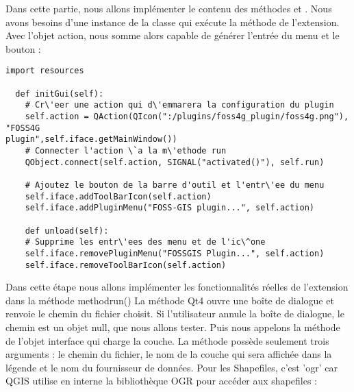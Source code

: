 
Dans cette partie, nous allons impl\'ementer le contenu des m\'ethodes
 et . Nous avons besoins d'une instance de la
classe  qui ex\'ecute la m\'ethode  de l'extension. Avec
l'objet action, nous somme alors capable de g\'en\'erer l'entr\'ee du menu et le
bouton :

\begin{verbatim}
import resources

  def initGui(self):
    # Cr\'eer une action qui d\'emmarera la configuration du plugin
    self.action = QAction(QIcon(":/plugins/foss4g_plugin/foss4g.png"), "FOSS4G
plugin",self.iface.getMainWindow())
    # Connecter l'action \`a la m\'ethode run
    QObject.connect(self.action, SIGNAL("activated()"), self.run)

    # Ajoutez le bouton de la barre d'outil et l'entr\'ee du menu
    self.iface.addToolBarIcon(self.action)
    self.iface.addPluginMenu("FOSS-GIS plugin...", self.action)

    def unload(self):
    # Supprime les entr\'ees des menu et de l'ic\^one
    self.iface.removePluginMenu("FOSSGIS Plugin...", self.action)
    self.iface.removeToolBarIcon(self.action)
\end{verbatim}


Dans cette \'etape nous allons impl\'ementer les fonctionnalit\'es r\'eelles de l'extension
dans la m\'ethode method{run()} La m\'ethode Qt4
 ouvre une bo\^ite de dialogue et renvoie le
chemin du fichier choisit. Si l'utilisateur annule la bo\^ite de dialogue, le
chemin est un objet null, que nous allons tester. Puis nous appelons la m\'ethode
 de l'objet interface qui charge la couche. La m\'ethode
poss\`ede seulement trois arguments : le chemin du fichier, le nom de la couche
qui sera affich\'ee dans la l\'egende et le nom du fournisseur de donn\'ees. Pour les
Shapefiles, c'est 'ogr' car QGIS utilise en interne la biblioth\`eque OGR pour
acc\'eder aux shapefiles :

